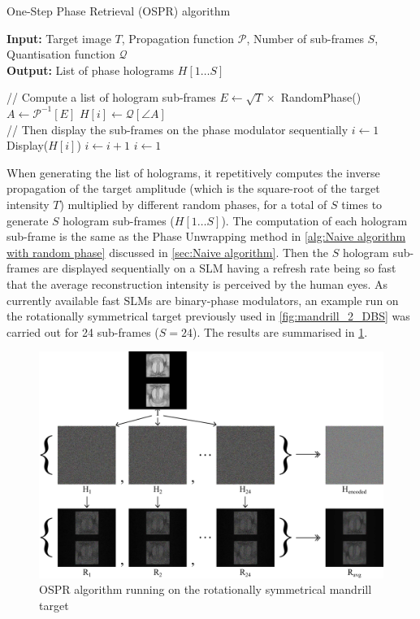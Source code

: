 \begin{algorithm}[H]
  \caption{One-Step Phase Retrieval (OSPR) algorithm}\label{alg:One-Step Phase Retrieval (OSPR) algorithm}
  \textbf{Input:} Target image $T$, Propagation function $\mathcal{P}$, Number of sub-frames $S$, Quantisation function $\mathcal{Q}$\\
  \textbf{Output:} List of phase holograms $H[1\ldots S]$
  \begin{algorithmic}
    \State // Compute a list of hologram sub-frames
    \State $E \gets \sqrt{T} \times $ RandomPhase()
    \State $A \gets \mathcal{P}^{-1}[E]$
    \State $H[i] \gets \mathcal{Q}[\angle A]$
    \EndFor\\
    \State // Then display the sub-frames on the phase modulator sequentially
    \State $i\gets 1$
    \State Display($H[i]$)
    \State $i\gets i + 1$
    \State $i\gets 1$
    \EndIf
    \EndWhile
  \end{algorithmic}
\end{algorithm}

When generating the list of holograms, it repetitively computes the inverse propagation of the target amplitude (which is the square-root of the target intensity $T$) multiplied by different random phases, for a total of $S$ times to generate $S$ hologram sub-frames ($H[1\ldots S]$). The computation of each hologram sub-frame is the same as the Phase Unwrapping method in \cref{alg:Naive algorithm with random phase} discussed in \cref{sec:Naive algorithm}. Then the $S$ hologram sub-frames are displayed sequentially on a SLM having a refresh rate being so fast that the average reconstruction intensity is perceived by the human eyes. As currently available fast SLMs are binary-phase modulators, an example run on the rotationally symmetrical target previously used in \cref{fig:mandrill_2_DBS} was carried out for 24 sub-frames ($S=24$). The results are summarised in \cref{fig:ospr_mandrill_2}.

\begin{figure}[H]
	\centering
	\includegraphics[width=1.0\textwidth]{ospr_mandrill_2.pdf}
	\caption{OSPR algorithm running on the rotationally symmetrical mandrill target}
	\label{fig:ospr_mandrill_2}
\end{figure}

